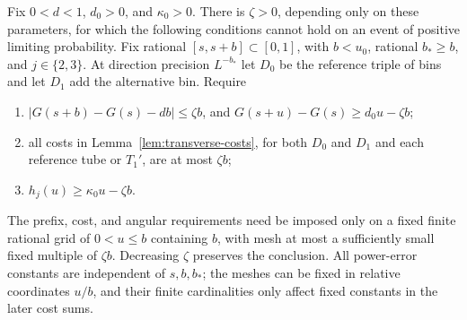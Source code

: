 \begin{lemma}\label{lem:transverse-block-test}
Fix $0<d<1$, $d_0>0$, and $\kappa_0>0$.  There is $\zeta>0$,
depending only on these parameters, for which the following
conditions cannot hold on an event of positive limiting probability.
Fix rational $[s,s+b]\subset[0,1]$, with $b<u_0$, rational
$b_*\ge b$, and $j\in\{2,3\}$.  At direction precision $L^{-b_*}$
let $D_0$ be the reference triple of bins and let $D_1$ add the
alternative bin.  Require
\begin{enumerate}[label=\textnormal{(\roman*)}]
 \item $|G(s+b)-G(s)-db|\le\zeta b$, and
       $G(s+u)-G(s)\ge d_0u-\zeta b$;
 \item all costs in Lemma~\ref{lem:transverse-costs}, for both
       $D_0$ and $D_1$ and each reference tube or $T_1'$, are at most
       $\zeta b$;
 \item $h_j(u)\ge\kappa_0u-\zeta b$.
\end{enumerate}
The prefix, cost, and angular requirements need be imposed only on
a fixed finite rational grid of $0<u\le b$ containing $b$, with
mesh at most a sufficiently small fixed multiple of $\zeta b$.
Decreasing $\zeta$ preserves the conclusion.  All power-error
constants are independent of $s,b,b_*$; the meshes can be fixed
in relative coordinates $u/b$, and their finite cardinalities
only affect fixed constants in the later cost sums.
\end{lemma}


